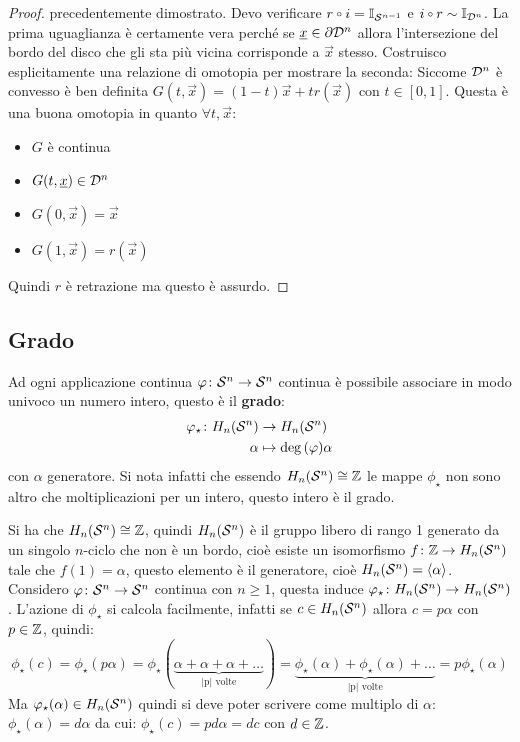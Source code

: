 \begin{proof}
  precedentemente dimostrato.
  Devo verificare $ r \circ i = \Id{\Sph{n-1}} $ e $ i \circ r \sim \Id{\Disk{n}} $.
  La prima uguaglianza è certamente vera perché se $ \underline{x} \in \partial \mathcal{D}^{n} $
  allora l'intersezione del bordo del disco che gli sta più vicina corrisponde a
  $ \vec{x} $ stesso.
  Costruisco esplicitamente una relazione di omotopia per mostrare la seconda:
  Siccome $ \mathcal{D}^{n} $ è convesso è ben definita $ G(t, \vec{x}) = (1-t)\vec{x}
  + t r(\vec{x}) $ con $ t \in [0,1] $. Questa è una buona omotopia in quanto $ \forall t, \vec{x} $:
  \begin{itemize}
  \item $ G $ è continua
  \item $ G(t, \underline{x}) \in \mathcal{D}^{n} $
  \item $ G(0, \vec{x}) = \vec{x} $
  \item $ G(1, \vec{x}) = r(\vec{x}) $
  \end{itemize}
  Quindi $ r $ è retrazione ma questo è assurdo.
\end{proof}


\subsection{Grado}
\begin{definition}
  Ad ogni applicazione continua $ \varphi \colon \mathcal{S}^{n} \to \mathcal{S}^{n} $ continua è possibile
  associare in modo univoco un numero intero, questo è il
  \textbf{grado}:
  \begin{align*}
    \varphi_\star \colon H_n(\mathcal{S}^{n}) & \to H_n(\mathcal{S}^{n}) \\
    \alpha & \mapsto  \deg{(\varphi)} \alpha
  \end{align*}
  con $ \alpha $ generatore. Si nota infatti che essendo
  $ H_n(\mathcal{S}^{n}) \cong \mathbb{Z} $ le mappe $ \phi_\star $ non sono altro che moltiplicazioni per
  un intero, questo intero è il grado.
\end{definition}

Si ha che $ H_n(\mathcal{S}^{n}) \cong \mathbb{Z} $, quindi $ H_n(\mathcal{S}^{n}) $ è il gruppo libero di
rango 1 generato da un singolo $ n $-ciclo che non è un bordo, cioè esiste un
isomorfismo $ f \colon \mathbb{Z} \to H_n(\mathcal{S}^{n}) $ tale che $ f(1) = \alpha $, questo elemento è
il generatore, cioè $ H_n(\mathcal{S}^{n}) = \langle\alpha\rangle $. Considero
$ \varphi \colon \mathcal{S}^{n} \to \mathcal{S}^{n} $ continua con $ n \geq 1 $, questa induce
$ \varphi_\star \colon H_n(\mathcal{S}^{n}) \to H_n(\mathcal{S}^{n}) $.
L'azione di $ \phi_\star $ si calcola facilmente, infatti se $ c \in H_n(\mathcal{S}^{n}) $
allora $ c = p \alpha $ con $ p \in \mathbb{Z} $, quindi:
\[
  \phi_\star (c) = \phi_\star (p \alpha) = \phi_\star (\underbrace{\alpha + \alpha + \alpha + \dots}_{\text{|p| volte}}) =
  \underbrace{\phi_\star (\alpha) + \phi_\star (\alpha) + \dots}_{\text{|p| volte}} = p \phi_\star(\alpha)
\]
Ma $ \varphi_\star(\alpha) \in H_n(\mathcal{S}^{n}) $ quindi si deve poter scrivere come multiplo di $ \alpha $:
$ \phi_\star (\alpha) = d \alpha $ da cui: $ \phi_\star (c) = p d \alpha = d c $ con $ d \in \mathbb{Z} $.

